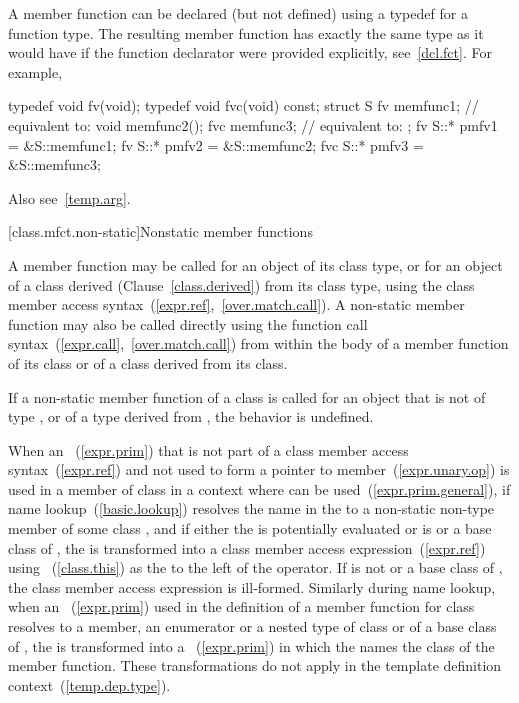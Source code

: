 \pnum
\enternote
A member function can be declared (but not defined) using a typedef for
a function type. The resulting member function has exactly the same type
as it would have if the function declarator were provided explicitly,
see~\ref{dcl.fct}. For example,

\begin{codeblock}
typedef void fv(void);
typedef void fvc(void) const;
struct S {
  fv memfunc1;      // equivalent to: 
  void memfunc2();
  fvc memfunc3;     // equivalent to: 
};
fv  S::* pmfv1 = &S::memfunc1;
fv  S::* pmfv2 = &S::memfunc2;
fvc S::* pmfv3 = &S::memfunc3;
\end{codeblock}

Also see~\ref{temp.arg}.
\exitnote

[class.mfct.non-static]{Nonstatic member functions}%

\pnum
A  member function may be called for an object of
its class type, or for an object of a class derived
(Clause~\ref{class.derived}) from its class type, using the class member
access syntax~(\ref{expr.ref},~\ref{over.match.call}). A non-static
member function may also be called directly using the function call
syntax~(\ref{expr.call},~\ref{over.match.call}) from within
the body of a member function of its class or of a class derived from
its class.

\pnum
{}%
If a non-static member function of a class  is called for an
object that is not of type , or of a type derived from
, the behavior is undefined.

\pnum
When an ~(\ref{expr.prim}) that is not part of a
class member access syntax~(\ref{expr.ref}) and not used to form a
pointer to member~(\ref{expr.unary.op}) is used in
a member of class  in a context where  can be
used~(\ref{expr.prim.general}),
if name
lookup~(\ref{basic.lookup}) resolves the name in the
 to a non-static non-type member of some class
,
and if either the  is potentially evaluated or
 is  or a base class of ,
the  is transformed into a class
member access expression~(\ref{expr.ref}) using
~(\ref{class.this}) as the 
to the left of the  operator.
\enternote
If  is not  or a base class of , the class
member access expression is ill-formed.
\exitnote
Similarly during name lookup, when an
~(\ref{expr.prim}) used in the definition of a
member function for class  resolves to a  member,
an enumerator or a nested type of class  or of a base class of
, the  is transformed into a
~(\ref{expr.prim}) in which the
 names the class of the member function.
These transformations do not apply in the
template definition context~(\ref{temp.dep.type}).
%
\enterexample

